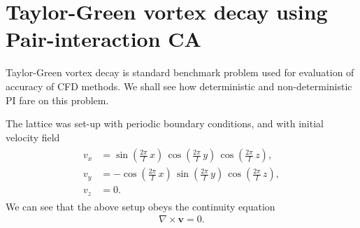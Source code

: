 \chapter{Taylor-Green vortex decay using Pair-interaction CA}

Taylor-Green vortex decay is standard benchmark problem used for evaluation of accuracy of CFD methods. We shall see how deterministic and non-deterministic PI fare on this problem.

The lattice was set-up with periodic boundary conditions, and with initial velocity field
\begin{align} \label{tginit}
\begin{split}
v_x &= \sin(\frac{2\pi}{I} \, x)\, \cos(\frac{2\pi}{I} \, y)\, \cos(\frac{2\pi}{I} \, z), \\
v_y &= -\cos(\frac{2\pi}{I} \, x)\, \sin(\frac{2\pi}{I} \, y)\, \cos(\frac{2\pi}{I} \, z), \\
v_z &= 0.
\end{split}
\end{align}
We can see that the above setup obeys the continuity equation
\begin{align*}
\nabla \times \bm{v} = 0.
\end{align*}

